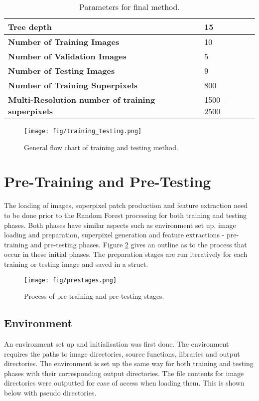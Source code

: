 \begin{table}[H]
\centering
\caption{Parameters for final method.}

\begin{tabular}{|l|l|l|}
\hline
\textbf{Tree depth}	& 15 \\		
\hline
\textbf{Number of Training Images} & 10 \\
\hline
\textbf{Number of Validation Images} & 5\\
\hline		
\textbf{Number of Testing Images} &  9 	\\ 	
\hline
\textbf{Number of Training Superpixels} & 800\\
\hline
\textbf{Multi-Resolution number of training superpixels} & 1500 - 2500\\		
\hline    	 
\end{tabular}
\label{table:finalparameters}
\end{table}

\begin{figure}[H]
\centering
\texttt{[image: fig/training\_testing.png]}
\caption{General flow chart of training and testing method.}
\label{fig:training_testing_flow}
\end{figure}

\section{Pre-Training and Pre-Testing}
\label{sect:pre}
The loading of images, superpixel patch production and feature extraction need to be done prior to the Random Forest processing for both training and testing phases. Both phases have similar aspects such as environment set up, image loading and preparation, superpixel generation and feature extractions - pre-training and pre-testing phases. Figure \ref{fig:prestages} gives an outline as to the process that occur in these initial phases. The preparation stages are run iteratively for each training or testing image and saved in a struct.

\begin{figure}[H]
\centering
\texttt{[image: fig/prestages.png]}
\caption{Process of pre-training and pre-testing stages.}
\label{fig:prestages}
\end{figure}

\subsection{Environment}
An environment set up and initialisation was first done. The environment requires the paths to image directories, source functions, libraries and output directories. The environment is set up the same way for both training and testing phases with their corresponding output directories. The file contents for image directories were outputted for ease of access when loading them.  This is shown below with pseudo directories.

